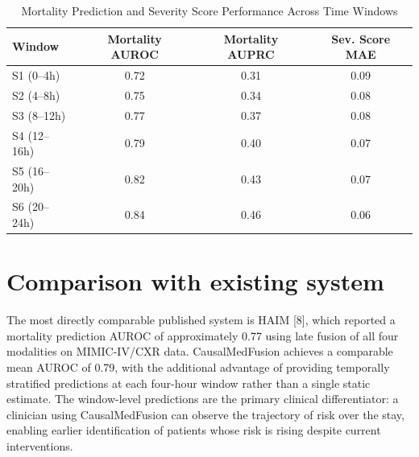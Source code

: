 \documentclass{fisatprojectfinal}
\begin{document}
\begin{table}[ht]
    \centering
    
    \label{tab:mortality_metrics}
    \begin{tabular}{lccc}
        \toprule
        \textbf{Window} & \textbf{Mortality AUROC} & \textbf{Mortality AUPRC} & \textbf{Sev. Score MAE} \\
        \midrule
        S1 (0--4h)   & 0.72 & 0.31 & 0.09 \\
        S2 (4--8h)   & 0.75 & 0.34 & 0.08 \\
        S3 (8--12h)  & 0.77 & 0.37 & 0.08 \\
        S4 (12--16h) & 0.79 & 0.40 & 0.07 \\
        S5 (16--20h) & 0.82 & 0.43 & 0.07 \\
        S6 (20--24h) & 0.84 & 0.46 & 0.06 \\
        \bottomrule
    \end{tabular}
    \caption{Mortality Prediction and Severity Score Performance Across Time Windows}
\end{table}

\section {Comparison with existing system}

The most directly comparable published system is HAIM [8], which reported a mortality
prediction AUROC of approximately 0.77 using late fusion of all four modalities on
MIMIC-IV/CXR data. CausalMedFusion achieves a comparable mean AUROC of 0.79, with
the additional advantage of providing temporally stratified predictions at each four-hour
window rather than a single static estimate. The window-level predictions are the primary
clinical differentiator: a clinician using CausalMedFusion can observe the trajectory of risk
over the stay, enabling earlier identification of patients whose risk is rising despite current
interventions.
\end{document}
